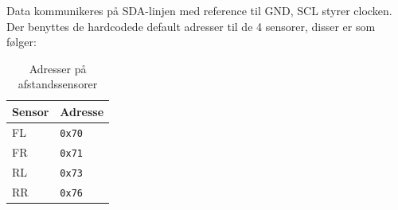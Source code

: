 Data kommunikeres på SDA-linjen med reference til GND,  SCL styrer clocken.
Der benyttes de hardcodede default adresser til de 4 sensorer, disser er som følger: 

\begin{table}[h]\centering
\begin{tabular}{| l | l |} \hline
	\textbf{Sensor} 	& \textbf{Adresse} \\\hline
	FL & \texttt{0x70} \\\hline
	FR & \texttt{0x71} \\\hline
	RL & \texttt{0x73} \\\hline
	RR & \texttt{0x76} \\\hline
\end{tabular}
\caption{Adresser på afstandssensorer}
\label{table:adr_afstandssensorer}
\end{table}